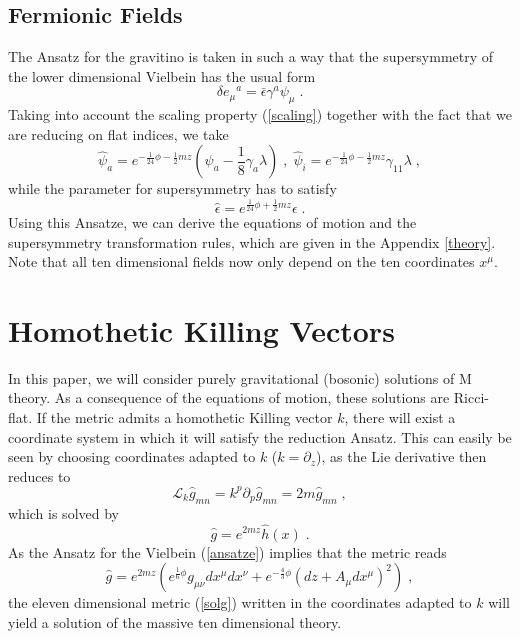 \documentclass[a4paper,12pt]{article}
\newcommand{\ft}[2]{{\textstyle\frac{#1}{#2}}}
\begin{document}
\subsection{Fermionic Fields}
The Ansatz for the gravitino is taken in such a way that the supersymmetry of the lower dimensional Vielbein has the usual form
\begin{equation}\label{viel}
\delta e_\mu {}^a= \bar{\epsilon} \gamma^a \psi_\mu\; .
\end{equation}
Taking into account the scaling property (\ref{scaling}) together with the fact that we are reducing on flat indices, we take
\begin{equation}
\hat{\psi}_a=e^{-\frac{1}{24} \phi -\frac{1}{2}mz}(\psi_a-\ft18 \gamma_a \lambda)\; , \;
\hat{\psi}_{i}=e^{-\frac{1}{24} \phi -\frac{1}{2}mz}\gamma_{11} \lambda\; ,
\end{equation}
while the parameter for supersymmetry has to satisfy
\begin{equation}\label{ansatzsusy}
\hat{\epsilon}=e^{\frac{1}{24} \phi +\frac{1}{2}mz}\epsilon\; .
\end{equation}
Using this Ansatze, we can derive the equations of motion and the supersymmetry transformation rules, which are given in the Appendix \ref{theory}. Note that all ten dimensional fields now only depend on the ten coordinates $x^\mu$.
\section{Homothetic Killing Vectors}\label{homothetic}
In this paper, we will consider purely gravitational (bosonic) solutions of M theory. As a consequence of the equations of motion, these solutions are Ricci-flat.
If the metric admits a homothetic Killing vector $k$, there will exist a coordinate system in which it will satisfy the reduction Ansatz. This can easily be seen by choosing coordinates adapted to $k$ ($k=\partial_z$), as the Lie derivative then reduces to
\begin{equation}
\mathcal{L}_k \hat{g}_{mn}=k^p \partial_p \hat{g}_{mn}=2m\hat{g}_{mn}\; ,
\end{equation}
which is solved by
\begin{equation}\label{solg}
\hat{g}=e^{2m z} \hat{h}(x)\; .
\end{equation}
As the Ansatz for the Vielbein (\ref{ansatze}) implies that the metric reads
\begin{equation} \label{ansatzg}
\hat{g}=e^{2mz}\left( e^{\frac16 \phi} g_{\mu \nu}dx^\mu dx^\nu+e^{-\frac43 \phi}(dz+A_\mu dx^\mu)^2 \right)\; ,
\end{equation}
the eleven dimensional metric (\ref{solg}) written in the coordinates adapted to $k$ will yield a solution of the massive ten dimensional theory.
\end{document}
